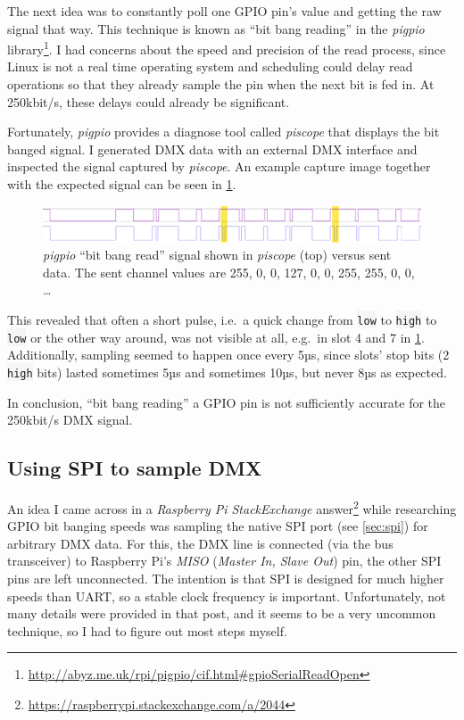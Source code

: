 The next idea was to constantly poll one GPIO pin's value and getting
the raw signal that way. This technique is known as ``bit bang reading''
in the \emph{pigpio} library\footnote{\url{http://abyz.me.uk/rpi/pigpio/cif.html\#gpioSerialReadOpen}}.
I had concerns about the speed and precision of the read process, since
Linux is not a real time operating system and scheduling could delay
read operations so that they already sample the pin when the next bit is
fed in. At 250kbit/s, these delays could already be significant.

Fortunately, \emph{pigpio} provides a diagnose tool called
\emph{piscope} that displays the bit banged signal. I generated DMX data
with an external DMX interface and inspected the signal captured by
\emph{piscope}. An example capture image together with the expected
signal can be seen in \cref{fig:piscope-vs-spi}.

\begin{figure}
\centering
\includegraphics[width=1.00000\textwidth]{Bilder/piscope-vs-spi.pdf}
\caption[\emph{pigpio} ``bit bang read'' signal shown in \emph{piscope}
(top) versus sent data]{\emph{pigpio} ``bit bang read'' signal shown in \emph{piscope}
(top) versus sent data. The sent channel values are 255, 0, 0, 127, 0,
0, 255, 255, 0, 0, \ldots{}}\label{fig:piscope-vs-spi}
\end{figure}

This revealed that often a short pulse, i.e.~a quick change from
\colorbox{WhiteSmoke}{\lstinline!low!} to \colorbox{WhiteSmoke}{\lstinline!high!} to \colorbox{WhiteSmoke}{\lstinline!low!} or the other way
around, was not visible at all, e.g.~in slot 4 and 7 in
\cref{fig:piscope-vs-spi}. Additionally, sampling seemed to happen once
every 5µs, since slots' stop bits (2 \colorbox{WhiteSmoke}{\lstinline!high!} bits) lasted
sometimes 5µs and sometimes 10µs, but never 8µs as expected.

In conclusion, ``bit bang reading'' a GPIO pin is not sufficiently
accurate for the 250kbit/s DMX signal.

\subsection{Using SPI to sample DMX}\label{using-spi-to-sample-dmx}

An idea I came across in a \emph{Raspberry Pi StackExchange}
answer\footnote{\url{https://raspberrypi.stackexchange.com/a/2044}}
while researching GPIO bit banging speeds was sampling the native SPI
port (see \cref{sec:spi}) for arbitrary DMX data. For this, the DMX line
is connected (via the bus transceiver) to Raspberry Pi's \emph{MISO}
(\emph{Master In, Slave Out}) pin, the other SPI pins are left
unconnected. The intention is that SPI is designed for much higher
speeds than UART, so a stable clock frequency is important.
Unfortunately, not many details were provided in that post, and it seems
to be a very uncommon technique, so I had to figure out most steps
myself.

